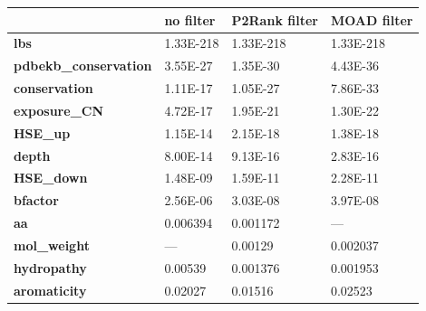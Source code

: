 \begin{table}[]
\begin{tabular}{llll}
\hline
                              & \textbf{no filter}              & \textbf{P2Rank filter}          & \textbf{MOAD filter}            \\ \hline
\textbf{lbs}                  & 1.33E-218                       & 1.33E-218                       & 1.33E-218                       \\
\textbf{pdbekb\_conservation} & 3.55E-27                        & 1.35E-30                        & 4.43E-36                        \\
\textbf{conservation}         & 1.11E-17                        & 1.05E-27                        & 7.86E-33                        \\
\textbf{exposure\_CN}         & 4.72E-17                        & 1.95E-21                        & 1.30E-22                        \\
\textbf{HSE\_up}              & 1.15E-14                        & 2.15E-18                        & 1.38E-18                        \\
\textbf{depth}                & 8.00E-14                        & 9.13E-16                        & 2.83E-16                        \\
\textbf{HSE\_down}            & 1.48E-09                        & 1.59E-11                        & 2.28E-11                        \\
\textbf{bfactor}              & 2.56E-06                        & 3.03E-08                        & 3.97E-08                        \\
\textbf{aa}                   & 0.006394                        & 0.001172                        & ---                             \\
\textbf{mol\_weight}          & ---                             & 0.00129                         & 0.002037                        \\
\textbf{hydropathy}           & 0.00539                         & 0.001376                        & 0.001953                        \\
\textbf{aromaticity}          & 0.02027                         & 0.01516                         & 0.02523                         \\

\end{tabular}
\end{table}
